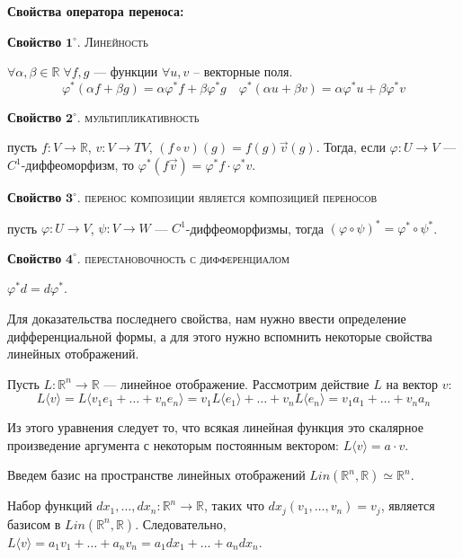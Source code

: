 \documentclass[a5paper]{article}
\theoremstyle{plain}
\theoremstyle{definition}
\numberwithin{through}{section}
\numberwithin{equation}{section}
\begin{document}
{\bf Свойства оператора переноса:}

\medskip
{\bf Свойство} $\mathbf{1^\circ.}$
{\textsc{Линейность}}

 $\forall \alpha, \beta \in \mathbb{R} \; \forall f, g$ --- функции $\forall u, v$ -- векторные поля.	
	\begin{equation*}
		\varphi^{*}(\alpha f + \beta g)=\alpha\varphi^{*}f + \beta\varphi^{*}g \quad \varphi^{*}(\alpha u + \beta v) = \alpha \varphi^{*}u + \beta\varphi^{*}v
	\end{equation*}
	
\medskip
{\bf Свойство} $\mathbf{2^\circ.}$
{\textsc{мультипликативность}}

 пусть $f : V \to \mathbb{R}$, $v : V \to TV$, $(f \circ v)(g)=f(g)\vec{v}(g)$. Тогда, если $\varphi : U \to V$ --- $C^1$-диффеоморфизм, то $\varphi^{*}(f \vec{v})=\varphi^{*}f \cdot \varphi^{*}v$.
	
\medskip
{\bf Свойство} $\mathbf{3^\circ.}$
{\textsc{перенос композиции является композицией переносов}}

	пусть $\varphi : U \to V$, $\psi : V \to W$ --- $C^1$-диффеоморфизмы, тогда $(\varphi \circ \psi)^{*}=\varphi^{*} \circ\psi^{*}$.
	
	\medskip
	{\bf Свойство} $\mathbf{4^\circ.}$
	{\textsc{перестановочность с дифференциалом}}
	
	$\varphi^{*}d=d \varphi^{*}$.
	


Для доказательства последнего свойства, нам нужно ввести определение дифференциальной формы, а для этого нужно вспомнить некоторые свойства линейных отображений.

Пусть $L : \mathbb{R}^n \to \mathbb{R}$ --- линейное отображение. Рассмотрим действие $L$ на вектор $v$:
\begin{equation*}
	L\langle v \rangle = L \langle v_1 e_1 + \ldots + v_n e_n \rangle = v_1 L\langle e_1 \rangle + \ldots + v_n L\langle e_n \rangle = v_1 a_1 + \ldots + v_n a_n
\end{equation*}

Из этого уравнения следует то, что всякая линейная функция это скалярное произведение аргумента с некоторым постоянным вектором: $L \langle v \rangle = a \cdot v$.

Введем базис на пространстве линейных отображений $Lin(\mathbb{R}^n, \mathbb{R}) \simeq \mathbb{R}^n$. 

Набор функций $dx_1, \ldots, dx_n : \mathbb{R}^n \to \mathbb{R}$, таких что $dx_j(v_1, \ldots, v_n)=v_j$, является базисом в $Lin(\mathbb{R}^n, \mathbb{R})$. Следовательно, $L \langle v \rangle = a_1 v_1 + \ldots + a_n v_n = a_1 dx_1 + \ldots + a_n dx_n$.
\end{document}
